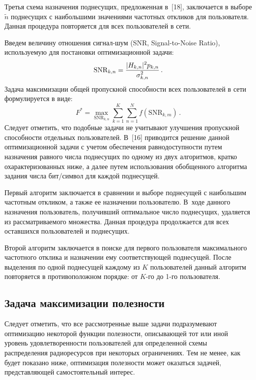 \begin{multicols}{2}
  Третья схема назначения поднесущих, предложенная в~[18], заключается в выборе 
$\tilde{n}$ поднесущих с наибольшими значениями частотных откликов для пользователя. 
Данная процедура повторяется для всех пользователей в сети.
  
  Введем величину отношения сигнал-шум (SNR, Signal-to-Noise Ratio), используемую 
для постановки оптимизационной задачи:
$$
\mathrm{SNR}_{k,n}=\displaystyle\frac{\displaystyle \vert H_{k,n}\vert^2 
p_{k,n}\mathstrut}{\displaystyle \sigma_{k,n}^2\mathstrut}\,.
$$ 
Задача максимизации общей пропускной способности всех 
пользователей в сети формулируется в виде:
$$
F^*=\max\limits_{\mathrm{SNR}_{k,n}} 
\sum\limits_{k=1}^K \sum\limits_{n=1}^N f(\mathrm{SNR}_{k,m})\,.
$$
Следует отметить, что подобные 
задачи не учитывают улучшения пропускной способности отдельных пользователей. 
В~[16] приводится решение данной оптимизационной задачи с учетом обеспечения 
рав\-но\-до\-ступ\-ности путем назначения равного чис\-ла поднесущих по одному из двух 
алгоритмов, кратко охарактеризованных ниже, а далее путем использования обобщенного 
алгоритма задания чис\-ла бит/символ для каждой поднесущей.
  
  Первый алгоритм заключается в сравнении и выборе поднесущей с наибольшим 
частотным откликом, а также ее назначении пользователю. В~ходе данного назначения 
пользователь, получивший оптимальное число поднесущих, удаляется из 
рассматриваемого множества. Данная процедура продолжается для всех оставшихся 
пользователей и поднесущих. 

Второй алгоритм заключается в поиске для первого 
пользователя максимального частотного отклика и назначении ему соответствующей 
поднесущей. После выделения по одной поднесущей каждому из $K$ пользователей 
данный алгоритм повторяется в противоположном порядке: от $K$-го до 1-го 
пользователя.

\subsection{Задача максимизации полезности}

  Следует отметить, что все рассмотренные выше задачи подразумевают оптимизацию 
некоторой функции полезности, описывающей тот или иной уровень удовлетворенности 
пользователей для определенной схемы распределения радиоресурсов при некоторых 
ограничениях. Тем не менее, как будет показано ниже, оптимизация полезности может 
оказаться задачей, представляющей самостоятельный интерес.
  

\end{multicols}
